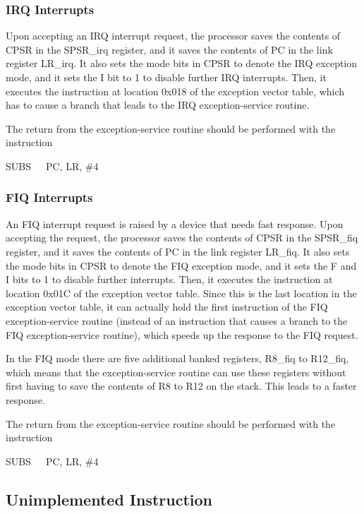 \documentclass[11pt, twoside, pdftex]{article}
\begin{document}
\subsubsection{IRQ Interrupts}
\label{sec:IRQ}

Upon accepting an IRQ interrupt request, the processor 
saves the contents of CPSR in the SPSR\_irq register, and
it saves the contents of PC in the link register LR\_irq.
It also sets the mode bits in CPSR to denote the IRQ exception
mode, and it sets the I bit to 1 to disable further IRQ
interrupts. Then, it executes the instruction at location
0x018 of the exception vector table, which has to cause
a branch that leads to the IRQ exception-service routine.

The return from the exception-service routine should be performed
with the instruction
\begin{center}
SUBS~~~PC, LR, \#4
\end{center}
\noindent

\subsubsection{FIQ Interrupts}

An FIQ interrupt request is raised by a device that needs fast
response. Upon accepting the request, the processor 
saves the contents of CPSR in the SPSR\_fiq register, and
it saves the contents of PC in the link register LR\_fiq.
It also sets the mode bits in CPSR to denote the FIQ exception
mode, and it sets the F and I bits to 1 to disable further
interrupts. Then, it executes the instruction at location
0x01C of the exception vector table. Since this is the last 
location in the exception vector table, it can actually hold
the first instruction of the FIQ exception-service routine
(instead of an instruction that causes a branch to the FIQ
exception-service routine), which speeds up the response to
the FIQ request.

In the FIQ mode there are five additional banked registers,
R8\_fiq to R12\_fiq, which means that the exception-service 
routine can use these registers without first having to save the 
contents of R8 to R12 on the stack. This leads to a faster
response.

The return from the exception-service routine should be performed
with the instruction
\begin{center}
SUBS~~~PC, LR, \#4
\end{center}
\noindent

\subsection{Unimplemented Instruction}
\end{document}
